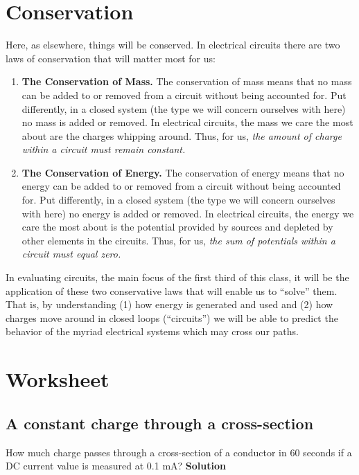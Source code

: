 \documentclass[11pt]{book}
\begin{document}
\section{Conservation}
Here, as elsewhere, things will be conserved. In electrical circuits there are two laws of conservation that will matter most for us:
\begin{enumerate}
	\item \textbf{The Conservation of Mass.} The conservation of mass means that no mass can be added to or removed from a circuit without being accounted for. Put differently, in a closed system (the type we will concern ourselves with here) no mass is added or removed.
	\subitem In electrical circuits, the mass we care the most about are the charges whipping around. Thus, for us, \textit{the amount of charge within a circuit must remain constant.}
	\item \textbf{The Conservation of Energy.} The conservation of energy means that no energy can be added to or removed from a circuit without being accounted for. Put differently, in a closed system (the type we will concern ourselves with here) no energy is added or removed.
	\subitem In electrical circuits, the energy we care the most about is the potential provided by sources and depleted by other elements in the circuits. Thus, for us, \textit{the sum of potentials within a circuit must equal zero.} 
\end{enumerate}

In evaluating circuits, the main focus of the first third of this class, it will be the application of these two conservative laws that will enable us to ``solve'' them. That is, by understanding (1) how energy is generated and used and (2) how charges move around in closed loops (``circuits'') we will be able to predict the behavior of the myriad electrical systems which may cross our paths.


 
\newpage



\section{Worksheet}

\subsection{A constant charge through a cross-section}
How much charge passes through a cross-section of a conductor in 60 seconds if a DC current value is measured at 0.1 mA?
\textbf{Solution}
\end{document}
